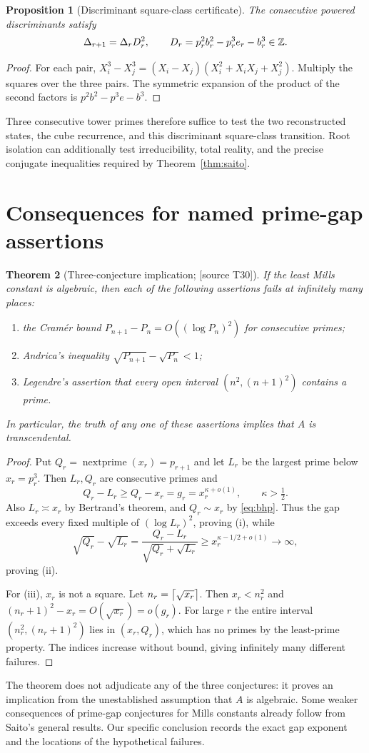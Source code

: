 \documentclass[11pt,a4paper]{article}
\newtheorem{theorem}{Theorem}[section]
\newtheorem{proposition}[theorem]{Proposition}
\theoremstyle{definition}\newtheorem{definition}[theorem]{Definition}
\theoremstyle{remark}\newtheorem{remark}[theorem]{Remark}
\newcommand{\sourceT}[1]{\textup{[source T#1]}}
\begin{document}
\begin{proposition}[Discriminant square-class certificate]\label{prop:discstep}
The consecutive powered discriminants satisfy
\[
 \Delta_{r+1}=\Delta_r D_r^2,
 \qquad D_r=p_r^2b_r^2-p_r^3e_r-b_r^3\in\mathbb Z.
\]
\end{proposition}
\begin{proof}
For each pair, $X_i^3-X_j^3=(X_i-X_j)(X_i^2+X_iX_j+X_j^2)$. Multiply the squares over the three pairs. The symmetric expansion of the product of the second factors is $p^2b^2-p^3e-b^3$.
\end{proof}
Three consecutive tower primes therefore suffice to test the two reconstructed states, the cube recurrence, and this discriminant square-class transition. Root isolation can additionally test irreducibility, total reality, and the precise conjugate inequalities required by Theorem~\ref{thm:saito}.

\section{Consequences for named prime-gap assertions}
\begin{theorem}[Three-conjecture implication; \sourceT{30}]\label{thm:three}
If the least Mills constant is algebraic, then each of the following assertions fails at infinitely many places:
\begin{enumerate}[label=(\roman*)]
\item the Cram\'er bound $P_{n+1}-P_n=O((\log P_n)^2)$ for consecutive primes;
\item Andrica's inequality $\sqrt{P_{n+1}}-\sqrt{P_n}<1$;
\item Legendre's assertion that every open interval $(n^2,(n+1)^2)$ contains a prime.
\end{enumerate}
In particular, the truth of any one of these assertions implies that $A$ is transcendental.
\end{theorem}
\begin{proof}
Put $Q_r=\operatorname{nextprime}(x_r)=p_{r+1}$ and let $L_r$ be the largest prime below $x_r=p_r^3$. Then $L_r,Q_r$ are consecutive primes and
\[
 Q_r-L_r\ge Q_r-x_r=g_r=x_r^{\kappa+o(1)},\qquad\kappa>\tfrac12.
\]
Also $L_r\asymp x_r$ by Bertrand's theorem, and $Q_r\sim x_r$ by \eqref{eq:bhp}. Thus the gap exceeds every fixed multiple of $(\log L_r)^2$, proving (i), while
\[
 \sqrt{Q_r}-\sqrt{L_r}
 =\frac{Q_r-L_r}{\sqrt{Q_r}+\sqrt{L_r}}
 \ge x_r^{\kappa-1/2+o(1)}\longrightarrow\infty,
\]
proving (ii).

For (iii), $x_r$ is not a square. Let $n_r=\left\lceil \sqrt{x_r}\right\rceil$. Then $x_r<n_r^2$ and $(n_r+1)^2-x_r=O(\sqrt{x_r})=o(g_r)$. For large $r$ the entire interval $(n_r^2,(n_r+1)^2)$ lies in $(x_r,Q_r)$, which has no primes by the least-prime property. The indices increase without bound, giving infinitely many different failures.
\end{proof}
The theorem does not adjudicate any of the three conjectures: it proves an implication from the unestablished assumption that $A$ is algebraic. Some weaker consequences of prime-gap conjectures for Mills constants already follow from Saito's general results. Our specific conclusion records the exact gap exponent and the locations of the hypothetical failures.
\end{document}
